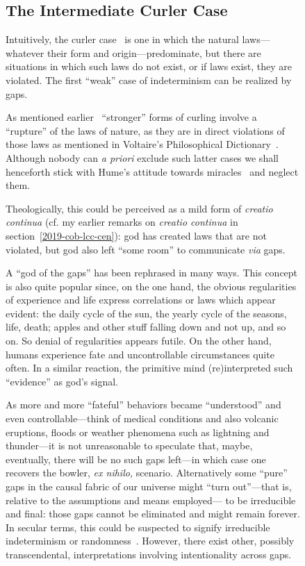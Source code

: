 \documentclass[entropy,article,accept,oneauthor,pdftex]{Definitions/mdpi}
\begin{document}
\begin{figure}[H]
\subsection{The Intermediate Curler Case}

Intuitively, the curler case~\cite{Clark-2017-GodAsCurler}
is one in which the natural laws---whatever their form and origin---predominate,
but there are situations in which such laws do not exist, or if laws exist, they are violated.
The first ``weak'' case of indeterminism can be realized by gaps.

As mentioned earlier~\cite[Sect.~III,~10]{frank,franke}
``stronger'' forms of curling involve a ``rupture'' of the laws of nature, as they
are in direct violations of those laws
as mentioned in Voltaire's Philosophical Dictionary~\cite[Chapter~330]{voltaire-dict}.
Although nobody can {\it a priori} exclude such latter cases we shall henceforth stick with
Hume's attitude towards miracles~\cite[Section~X]{Hume-Enquiry} and neglect them.

Theologically, this could be perceived as a mild form of {\it creatio continua} (cf. my earlier remarks on {\it creatio continua}
in section~\ref{2019-cob-lcc-cen}): god has created laws that are not violated,
but god also left  ``some room'' to communicate  {\it via} gaps.

A ``god of the gaps'' has been rephrased in many ways.
This concept is also quite popular since, on the one hand, the obvious regularities of experience and life express correlations or laws which appear evident:
the daily cycle of the sun, the yearly cycle of the seasons, life, death; apples and other stuff falling down and not up, and so on.
So denial of regularities appears futile.
On the other hand, humans experience fate and uncontrollable circumstances quite often.
In a similar reaction, the primitive mind (re)interpreted such ``evidence'' as god's signal.

As more and more ``fateful'' behaviors became ``understood'' and even controllable---think of medical conditions and also
volcanic eruptions,
floods or weather phenomena such as lightning and thunder---it is not unreasonable to speculate that,
maybe, eventually, there will be no such gaps left---in which case
one recovers the bowler, {\it ex nihilo,} scenario.
Alternatively some ``pure'' gaps in the causal fabric of our universe
might ``turn out''---that is, relative to the assumptions and means employed---
to be irreducible and final: those gaps cannot be eliminated and might remain forever.
In secular terms, this could be suspected to signify irreducible indeterminism or randomness~\cite{zeil-05_nature_ofQuantum}.
However, there exist other, possibly transcendental, interpretations involving  intentionality across gaps.


\end{figure}
\end{document}
